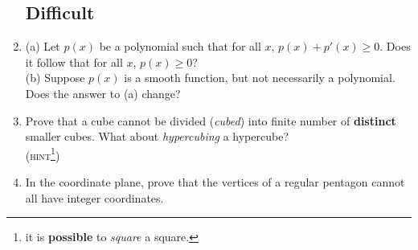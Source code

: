 \documentclass[12pt]{article}
\begin{document}
\begin{enumerate}
	\subsection*{Difficult}
	\item{(a) Let $p(x)$ be a polynomial such that for all $x$, $p(x) + p'(x) \ge 0$. Does it follow that for all $x$, $p(x) \ge 0$? 
\\(b) Suppose $p(x)$ is a smooth function, but not necessarily a polynomial. Does the answer to (a) change?}
	
	\item{Prove that a cube cannot be divided (\emph{cubed}) into finite number of \textbf{distinct} smaller cubes. What about \emph{hypercubing} a hypercube? \\
(\textsc{hint\footnote{it is \textbf{possible} to \emph{square} a square.})}}
	
	\item{In the coordinate plane, prove that the vertices of a regular pentagon cannot all have integer coordinates.}

\end{enumerate}
\end{document}
